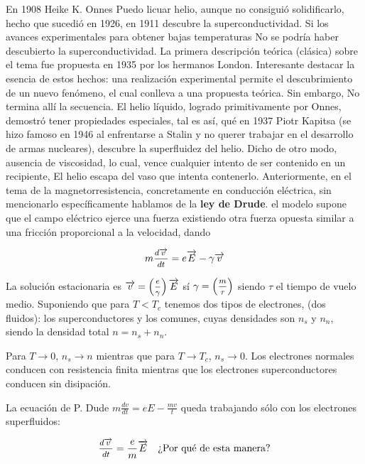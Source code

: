 En 1908 Heike K. Onnes Puedo licuar helio, aunque no consiguió solidificarlo, hecho que sucedió en 1926, en 1911 descubre la superconductividad. Si los avances experimentales para obtener bajas temperaturas No se podría haber descubierto la superconductividad. La primera descripción teórica (clásica) sobre el tema fue propuesta en 1935 por los hermanos London. Interesante destacar la esencia de estos hechos: una realización experimental permite el descubrimiento de un nuevo fenómeno, el cual conlleva a una propuesta teórica. Sin embargo, No termina allí la secuencia. El helio líquido, logrado primitivamente por Onnes, demostró tener propiedades especiales, tal es así, qué en 1937 Piotr Kapitsa (se hizo famoso en 1946 al enfrentarse a Stalin y no querer trabajar en el desarrollo de armas nucleares), descubre la superfluidez del helio. Dicho de otro modo, ausencia de viscosidad, lo cual, vence cualquier intento de ser contenido en un recipiente, El helio escapa del vaso que intenta contenerlo.
Anteriormente, en el tema de la magnetorresistencia, concretamente en conducción eléctrica, sin mencionarlo específicamente hablamos de la \textbf{ley de Drude}. el modelo supone que el campo eléctrico ejerce una fuerza existiendo otra fuerza opuesta similar a una fricción proporcional a la velocidad, dando

\begin{equation}
	m\mfrac{d\overrightarrow{v}}{dt}=e\overrightarrow{E}-\gamma \overrightarrow{v}
\end{equation}

La solución estacionaria es $\overrightarrow{v}=\left(\mfrac{e}{\gamma} \right) \overrightarrow{E}$ sí $\gamma=\left(\mfrac{m}{\tau} \right)$ siendo $\tau$ el tiempo de vuelo medio. Suponiendo que para $T<T_{c}$ tenemos dos tipos de electrones, (dos fluidos): los superconductores y los comunes, cuyas densidades son $n_{s}$ y $n_{n}$, siendo la densidad total $n=n_{s}+n_{n}$.

Para $T\rightarrow 0$, $n_{s}\rightarrow n$ mientras que para $T\rightarrow T_{c}$, $n_{s}\rightarrow 0$. Los electrones normales conducen con resistencia finita mientras que los electrones superconductores conducen sin disipación. 

La ecuación de P. Dude $m\frac{dv}{dt} = eE-\frac{mv}{t}$ queda trabajando sólo con los electrones superfluidos:

\begin{equation}
	\mfrac{d\overrightarrow{v}}{dt}=\frac{e}{m}\overrightarrow{E} \quad \text{¿Por qué de esta manera?}
\end{equation}


